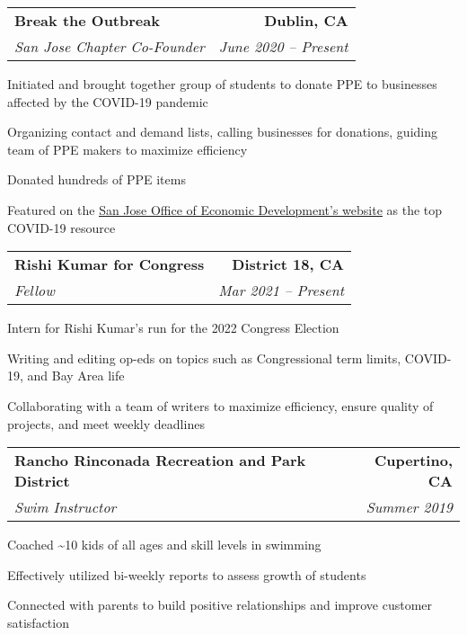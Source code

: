 \documentclass{article}
\newlength{\secskip}
\begin{document}
\goodbreak\vspace{\secskip}\par\noindent\begin{tabularx}{\linewidth}{Xr}
    \textbf{Break the Outbreak} & \textbf{Dublin, CA}\\
    \textit{San Jose Chapter Co-Founder} & \textit{June 2020 -- Present}\\
\end{tabularx}
\begin{compactitem}
\item Initiated and brought together group of students to donate PPE to businesses affected by the COVID-19 pandemic
\item Organizing contact and demand lists, calling businesses for donations, guiding team of PPE makers to maximize efficiency
\item Donated hundreds of PPE items
\item Featured on the \href{https://www.sjeconomy.com/why-san-jose/covid-19-guidance/local-suppliers}{\underline{San Jose Office of Economic Development's website}} as the top COVID-19 resource
\end{compactitem}

\goodbreak\vspace{\secskip}\par\noindent\begin{tabularx}{\linewidth}{Xr}
    \textbf{Rishi Kumar for Congress} & \textbf{District 18, CA}\\
    \textit{Fellow} & \textit{Mar 2021 -- Present}\\
\end{tabularx}
\begin{compactitem}
\item Intern for Rishi Kumar's run for the 2022 Congress Election
\item Writing and editing op-eds on topics such as Congressional term limits, COVID-19, and Bay Area life
\item Collaborating with a team of writers to maximize efficiency, ensure quality of projects, and meet weekly deadlines
\end{compactitem}

\goodbreak\vspace{\secskip}\par\noindent\begin{tabularx}{\linewidth}{Xr}
    \textbf{Rancho Rinconada Recreation and Park District} & \textbf{Cupertino, CA}\\
    \textit{Swim Instructor} & \textit{Summer 2019}\\
\end{tabularx}
\begin{compactitem}
\item Coached \textasciitilde{}10 kids of all ages and skill levels in swimming
\item Effectively utilized bi-weekly reports to assess growth of students
\item Connected with parents to build positive relationships and improve customer satisfaction
\end{compactitem}

    
\end{document}

